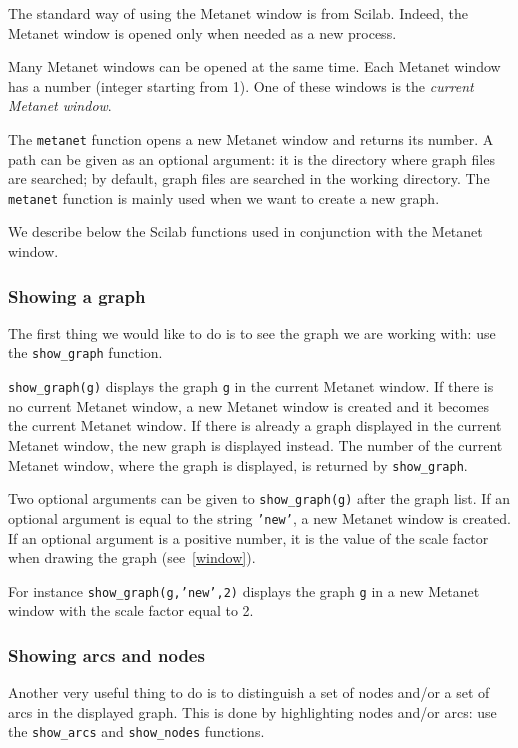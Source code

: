 \documentclass[11pt]{article}
\newcommand{\func}[1]{\texttt{#1}}
\begin{document}
The standard way of using the Metanet window is from
Scilab. Indeed, the Metanet window is opened only when needed as a
new process.

Many Metanet windows can be opened at the same time. Each Metanet
window has a number (integer starting from 1). One of these windows is
the \emph{current Metanet window}.

The \func{metanet} function opens a new Metanet window and returns its
number. A path can be given as an optional argument: it is the
directory where graph files are searched; by default, graph files are
searched in the working directory. The \func{metanet} function is
mainly used when we want to create a new graph.

We describe below the Scilab functions used in
conjunction with the Metanet window.

\subsubsection{Showing a graph}

The first thing we would like to do is to see the graph we are working
with: use the \func{show\_graph} function.

\texttt{show\_graph(g)} displays the graph \texttt{g} in the current
Metanet window. 
If there is no current Metanet window, a new Metanet window is created
and it becomes the current Metanet window.
If there is already a graph displayed in the current Metanet window,
the new graph is displayed instead. The number of the current Metanet
window, where the graph is displayed, is returned by \func{show\_graph}.

Two optional arguments can be given to \texttt{show\_graph(g)} after
the graph list.
If an optional argument is equal to the string \texttt{'new'}, a new 
Metanet window is created.
If an optional argument is a positive number, it is the value of the
scale factor when drawing the graph (see~\ref{window}).

For instance \texttt{show\_graph(g,'new',2)} displays the graph
\texttt{g} in a new Metanet window with the scale factor equal to 2.

\subsubsection{Showing arcs and nodes}

Another very useful thing to do is to distinguish a set of nodes
and/or a set of arcs in the displayed graph. This is done by
highlighting nodes and/or arcs: use the \func{show\_arcs} and
\func{show\_nodes} functions.
\end{document}

